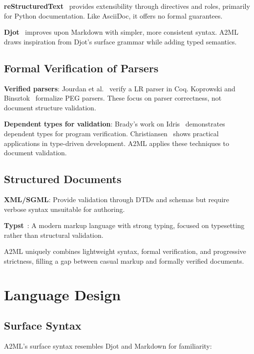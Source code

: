 \documentclass[10pt,twocolumn]{article}
\begin{document}
\textbf{reStructuredText}~\cite{rst} provides extensibility through directives and roles, primarily for Python documentation. Like AsciiDoc, it offers no formal guarantees.

\textbf{Djot}~\cite{djot} improves upon Markdown with simpler, more consistent syntax. A2ML draws inspiration from Djot's surface grammar while adding typed semantics.

\subsection{Formal Verification of Parsers}

\textbf{Verified parsers}: Jourdan et al.~\cite{jourdan-parser} verify a LR parser in Coq. Koprowski and Binsztok~\cite{koprowski-peg} formalize PEG parsers. These focus on parser correctness, not document structure validation.

\textbf{Dependent types for validation}: Brady's work on Idris~\cite{idris-book} demonstrates dependent types for program verification. Christiansen~\cite{christiansen-dependent} shows practical applications in type-driven development. A2ML applies these techniques to document validation.

\subsection{Structured Documents}

\textbf{XML/SGML}: Provide validation through DTDs and schemas but require verbose syntax unsuitable for authoring.

\textbf{Typst}~\cite{typst}: A modern markup language with strong typing, focused on typesetting rather than structural validation.

A2ML uniquely combines lightweight syntax, formal verification, and progressive strictness, filling a gap between casual markup and formally verified documents.

\section{Language Design}
\label{sec:design}

\subsection{Surface Syntax}

A2ML's surface syntax resembles Djot and Markdown for familiarity:
\end{document}
